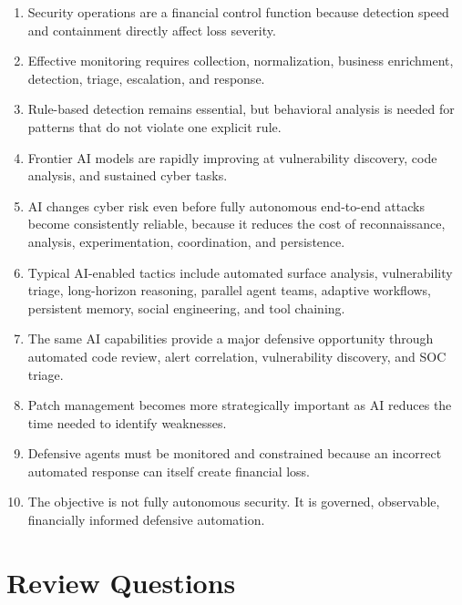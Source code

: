 \begin{enumerate}
    \item Security operations are a financial control function because detection speed and containment directly affect loss severity.
    \item Effective monitoring requires collection, normalization, business enrichment, detection, triage, escalation, and response.
    \item Rule-based detection remains essential, but behavioral analysis is needed for patterns that do not violate one explicit rule.
    \item Frontier AI models are rapidly improving at vulnerability discovery, code analysis, and sustained cyber tasks.
    \item AI changes cyber risk even before fully autonomous end-to-end attacks become consistently reliable, because it reduces the cost of reconnaissance, analysis, experimentation, coordination, and persistence.
    \item Typical AI-enabled tactics include automated surface analysis, vulnerability triage, long-horizon reasoning, parallel agent teams, adaptive workflows, persistent memory, social engineering, and tool chaining.
    \item The same AI capabilities provide a major defensive opportunity through automated code review, alert correlation, vulnerability discovery, and SOC triage.
    \item Patch management becomes more strategically important as AI reduces the time needed to identify weaknesses.
    \item Defensive agents must be monitored and constrained because an incorrect automated response can itself create financial loss.
    \item The objective is not fully autonomous security. It is governed, observable, financially informed defensive automation.
\end{enumerate}

\section{Review Questions}

